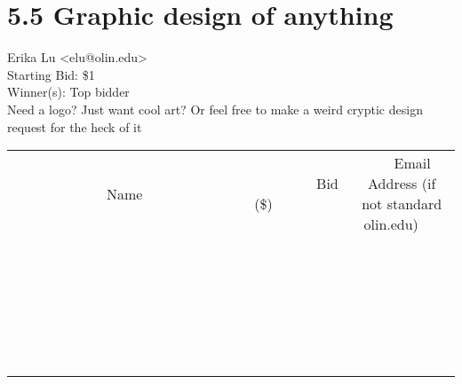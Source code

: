 \documentclass[11pt]{article}
\begin{document}
					\section*{5.5 Graphic design of anything}
					Erika Lu <elu@olin.edu> \\
					Starting Bid: \$1 \\
					Winner(s): Top bidder \\
					Need a logo? Just want cool art? Or feel free to make a weird cryptic design request for the heck of it \\
					[6ex]
					\begin{tabular}{c c c}
						~~~~~~~~~~~~~Name~~~~~~~~~~~~~ & ~~~~~~~~~Bid (\$)~~~~~~~~~ & ~~~Email Address (if not standard olin.edu)~~~ \\
				
 & & \\
\hline
 & & \\
\hline
 & & \\
\hline
 & & \\
\hline
 & & \\
\hline
 & & \\
\hline
 & & \\
\hline
 & & \\
\hline
 & & \\
\hline
 & & \\
\hline
 & & \\
\hline
 & & \\
\hline
 & & \\
\hline
 & & \\
\hline
 & & \\
\hline
 & & \\
\hline
 & & \\
\hline
 & & \\
\hline
 & & \\
\hline
 & & \\
\hline
 & & \\
\hline
 & & \\
\hline
 & & \\
\hline
 & & \\
\hline
 & & \\
\hline
 & & \\
\hline
					\end{tabular}
					\clearpage
				
\end{document}
